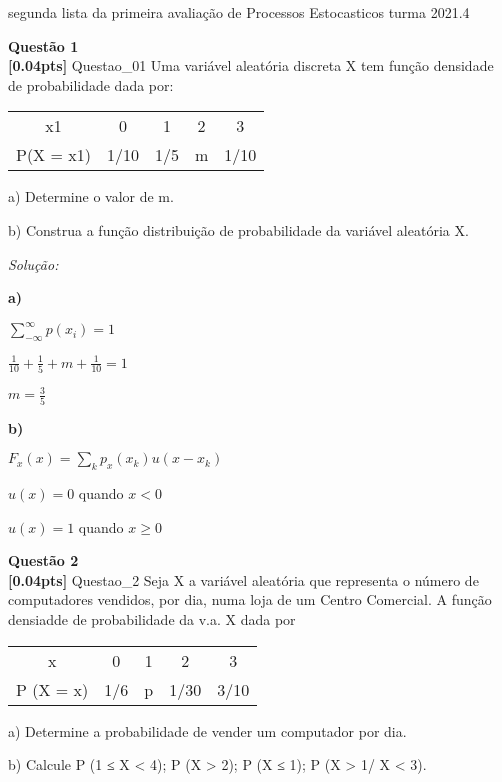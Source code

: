 \documentclass{article}
\newenvironment{problem}[2][Questão]
    { \begin{mdframed}[backgroundcolor=gray!20] \textbf{#1 #2} \\}
    {  \end{mdframed}}
\newenvironment{solution}
    {\textit{Solução:}}
    {}
\begin{document}
\begin{mdframed}[backgroundcolor=blue!20]
segunda lista da primeira avaliação de Processos Estocasticos turma 2021.4
\end{mdframed}

\begin{problem}{1}
\textbf{[0.04pts]} Questao\_01 Uma variável aleatória discreta X tem função densidade de probabilidade dada por:
\begin{center}
\begin{tabular}{ |c|c|c|c|c| }
\hline
 x1        & 0    & 1   & 2 & 3   \\
 P(X = x1) & 1/10 & 1/5 & m & 1/10 \\
 \hline
\end{tabular}
\end{center}


 a)   Determine o valor de m. 
 
 b) Construa a função distribuição de probabilidade da variável aleatória X.

\end{problem}

\begin{solution}

\textbf{a)}

$\sum_{-\infty}^{\infty} p(x_{i}) = 1$

$\frac{1}{10} + \frac{1}{5} + m + \frac{1}{10} = 1$

$m = \frac{3}{5}$

\hrulefill

\textbf{b)}

$F_{x}(x) =  \sum_{k}^{} p_{x}(x_{k}) u(x - x_{k})$

$u(x) = 0$ quando $x < 0 $

$u(x) = 1$ quando $x \geq 0$

\end{solution}

\begin{problem}{2}
\textbf{[0.04pts]} Questao\_2 Seja X a variável aleatória que representa o número de computadores vendidos, por dia, numa loja de um Centro Comercial. A função densiadde de probabilidade da v.a. X dada por 

\begin{center}
\begin{tabular}{ |c|c|c|c|c|}
\hline

x & 0 & 1 & 2 & 3 \\
P (X = x) & 1/6 & p & 1/30 & 3/10 \\

 \hline
\end{tabular}
\end{center}

a) Determine a probabilidade de vender um computador por dia.

b) Calcule P (1 ≤ X < 4); P (X > 2); P (X ≤ 1); P (X > 1/ X < 3).

\end{problem}
\end{document}
